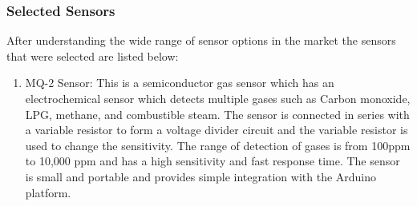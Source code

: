  
 \subsubsection{Selected Sensors}

 After understanding the wide range of sensor options in the market the sensors that were selected are listed below: 
 \begin{enumerate}

  \item MQ-2 Sensor: This is a semiconductor gas sensor which has an electrochemical sensor which detects multiple gases such as Carbon monoxide, LPG, methane, and combustible steam. The sensor is connected in series with a variable resistor to form a voltage divider circuit and the variable resistor is used to change the sensitivity. The range of detection of gases is from 100ppm to 10,000 ppm and has a high sensitivity and fast response time. The sensor is small and portable and provides simple integration with the Arduino platform. %

\end{enumerate}
